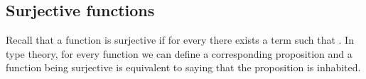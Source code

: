 \documentclass[letterpaper,10pt,english]{sphinxmanual}
\begin{document}
\begin{sphinxVerbatim}[commandchars=\\\{\}]
      
          
        
    
\end{sphinxVerbatim}


\subsection{Surjective functions}
\label{\detokenize{day2:surjective-functions}}
\sphinxAtStartPar
Recall that a function  is surjective if for every  there exists a term 
such that .
In type theory, for every function  we can define a corresponding proposition
 and a function being surjective is equivalent to saying that the proposition  is inhabited.
\end{document}
